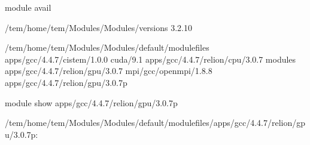 \documentclass[letterpaper,10pt,english]{sphinxmanual}
\begin{document}
\begin{sphinxVerbatim}[commandchars=\\\{\}]
\PYGZdl{}\PYGZgt{} module avail

\PYGZhy{}\PYGZhy{}\PYGZhy{}\PYGZhy{}\PYGZhy{}\PYGZhy{}\PYGZhy{}\PYGZhy{}\PYGZhy{}\PYGZhy{}\PYGZhy{}\PYGZhy{}\PYGZhy{}\PYGZhy{}\PYGZhy{}\PYGZhy{}\PYGZhy{}\PYGZhy{}\PYGZhy{}\PYGZhy{}\PYGZhy{}\PYGZhy{}\PYGZhy{}\PYGZhy{}\PYGZhy{}\PYGZhy{}\PYGZhy{} /tem/home/tem/Modules/Modules/versions \PYGZhy{}\PYGZhy{}\PYGZhy{}\PYGZhy{}\PYGZhy{}\PYGZhy{}\PYGZhy{}\PYGZhy{}\PYGZhy{}\PYGZhy{}\PYGZhy{}\PYGZhy{}\PYGZhy{}\PYGZhy{}\PYGZhy{}\PYGZhy{}\PYGZhy{}\PYGZhy{}\PYGZhy{}\PYGZhy{}\PYGZhy{}\PYGZhy{}\PYGZhy{}\PYGZhy{}\PYGZhy{}\PYGZhy{}\PYGZhy{}
3.2.10

\PYGZhy{}\PYGZhy{}\PYGZhy{}\PYGZhy{}\PYGZhy{}\PYGZhy{}\PYGZhy{}\PYGZhy{}\PYGZhy{}\PYGZhy{}\PYGZhy{}\PYGZhy{}\PYGZhy{}\PYGZhy{}\PYGZhy{}\PYGZhy{}\PYGZhy{}\PYGZhy{}\PYGZhy{}\PYGZhy{}\PYGZhy{} /tem/home/tem/Modules/Modules/default/modulefiles \PYGZhy{}\PYGZhy{}\PYGZhy{}\PYGZhy{}\PYGZhy{}\PYGZhy{}\PYGZhy{}\PYGZhy{}\PYGZhy{}\PYGZhy{}\PYGZhy{}\PYGZhy{}\PYGZhy{}\PYGZhy{}\PYGZhy{}\PYGZhy{}\PYGZhy{}\PYGZhy{}\PYGZhy{}\PYGZhy{}\PYGZhy{}\PYGZhy{}
apps/gcc/4.4.7/cistem/1.0.0      cuda/9.1
apps/gcc/4.4.7/relion/cpu/3.0.7  modules
apps/gcc/4.4.7/relion/gpu/3.0.7  mpi/gcc/openmpi/1.8.8
apps/gcc/4.4.7/relion/gpu/3.0.7p

\PYGZdl{}\PYGZgt{} module show apps/gcc/4.4.7/relion/gpu/3.0.7p

\PYGZhy{}\PYGZhy{}\PYGZhy{}\PYGZhy{}\PYGZhy{}\PYGZhy{}\PYGZhy{}\PYGZhy{}\PYGZhy{}\PYGZhy{}\PYGZhy{}\PYGZhy{}\PYGZhy{}\PYGZhy{}\PYGZhy{}\PYGZhy{}\PYGZhy{}\PYGZhy{}\PYGZhy{}\PYGZhy{}\PYGZhy{}\PYGZhy{}\PYGZhy{}\PYGZhy{}\PYGZhy{}\PYGZhy{}\PYGZhy{}\PYGZhy{}\PYGZhy{}\PYGZhy{}\PYGZhy{}\PYGZhy{}\PYGZhy{}\PYGZhy{}\PYGZhy{}\PYGZhy{}\PYGZhy{}\PYGZhy{}\PYGZhy{}\PYGZhy{}\PYGZhy{}\PYGZhy{}\PYGZhy{}\PYGZhy{}\PYGZhy{}\PYGZhy{}\PYGZhy{}\PYGZhy{}\PYGZhy{}\PYGZhy{}\PYGZhy{}\PYGZhy{}\PYGZhy{}\PYGZhy{}\PYGZhy{}\PYGZhy{}\PYGZhy{}\PYGZhy{}\PYGZhy{}\PYGZhy{}\PYGZhy{}\PYGZhy{}\PYGZhy{}\PYGZhy{}\PYGZhy{}\PYGZhy{}\PYGZhy{}
/tem/home/tem/Modules/Modules/default/modulefiles/apps/gcc/4.4.7/relion/gpu/3.0.7p:


\end{sphinxVerbatim}
\end{document}
